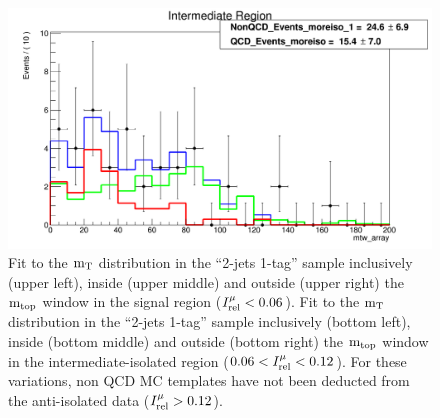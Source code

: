{\begin{figure}[h!]
{\begin{centering}
\includegraphics[scale=0.2]{figures/2J1T/MTW_fit_2j1t_moreiso_SB_NononQCDsubtraction}
\par\end{centering}
}
\caption{Fit to the ${\rm m_{T}}$ distribution in the \textquotedblleft{}2-jets
1-tag\textquotedblright{} sample inclusively (upper left), inside
(upper middle) and outside (upper right) the ${\rm m_{top}}$ window in
the signal region ($I_{\rm rel}^{\mu} < 0.06$). Fit to the ${\rm m_{T}}$ distribution in the
\textquotedblleft{}2-jets 1-tag\textquotedblright{} sample inclusively
(bottom left), inside (bottom middle) and outside (bottom right) the ${\rm m_{top}}$
window in the intermediate-isolated region ($0.06 < I_{\rm rel}^{\mu} < 0.12$). For these variations,
non QCD MC templates have not been deducted from the anti-isolated
data ($I_{\rm rel}^{\mu} > 0.12$).}
\end{figure}


}
